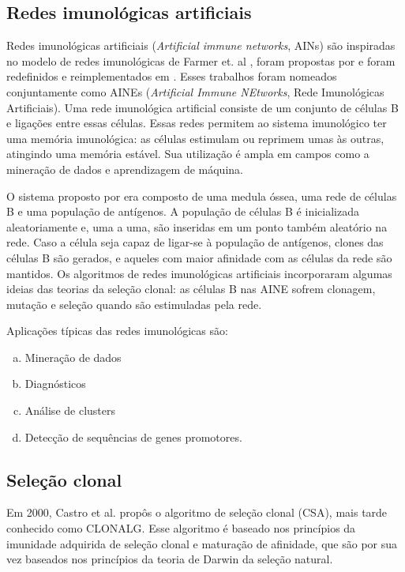 \subsection{Redes imunológicas artificiais}

Redes imunológicas artificiais (\emph{Artificial immune networks}, AINs) são inspiradas no modelo de redes imunológicas de Farmer et. al \cite{Farmer1986}, foram propostas por \citet{Ishida1990} e foram redefinidos e reimplementados em \citet{Timmis2000}. Esses trabalhos foram nomeados conjuntamente como AINEs (\emph{Artificial Immune NEtworks}, Rede Imunológicas Artificiais). Uma rede imunológica artificial consiste de um conjunto de células B e ligações entre essas células. Essas redes permitem ao sistema imunológico ter uma memória imunológica: as células estimulam ou reprimem umas às outras, atingindo uma memória estável. Sua utilização é ampla em campos como a mineração de dados e aprendizagem de máquina.

O sistema proposto por \citeauthor{Timmis2000} era composto de uma medula óssea, uma rede de células B e uma população de antígenos. A população de células B é inicializada aleatoriamente e, uma a uma, são inseridas em um ponto também aleatório na rede. Caso a célula seja capaz de ligar-se à população de antígenos, clones das células B são gerados, e aqueles com maior afinidade com as células da rede são mantidos. Os algoritmos de redes imunológicas artificiais incorporaram algumas ideias das teorias da seleção clonal: as células B nas AINE sofrem clonagem, mutação e seleção quando são estimuladas pela rede.

Aplicações típicas das redes imunológicas são:

\begin{enumerate}[a)]
    \item Mineração de dados
    \item Diagnósticos
    \item Análise de clusters
    \item Detecção de sequências de genes promotores.
\end{enumerate}

\subsection{Seleção clonal}
\label{sec:ais_clonalg}

Em 2000, Castro et al.\cite{Castro2000} propôs o algoritmo de seleção clonal (CSA), mais tarde conhecido como CLONALG. Esse algoritmo é baseado nos princípios da imunidade adquirida de seleção clonal e maturação de afinidade, que são por sua vez baseados nos princípios da teoria de Darwin da seleção natural.

